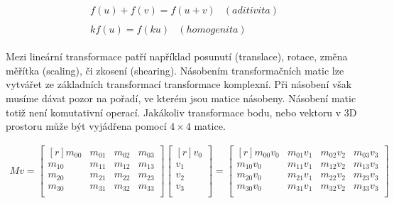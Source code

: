 \begin{align}
\begin{split}
f(u) + f(v) = f(u+v) 
\end{split}
\begin{split}
 (aditivita)
\end{split} \\
\begin{split}
kf(u) = f(ku)
\end{split}
\begin{split}
 (homogenita)
 \end{split}
\end{align}


Mezi lineární transformace patří například posunutí (translace), rotace, změna měřítka (scaling), či zkosení (shearing). Násobením transformačních matic lze vytvářet ze základních transformací transformace komplexní. Při násobení však musíme dávat pozor na pořadí, ve kterém jsou matice násobeny. Násobení matic totiž není komutativní operací. Jakákoliv transformace bodu, nebo vektoru v 3D prostoru může být vyjádřena pomocí $4 \times 4$ matice.

\begin{align} 
Mv = \begin{bmatrix*}[r]
  m_{00} & m_{01} & m_{02} & m_{03} \\
  m_{10} & m_{11} & m_{12} & m_{13} \\
  m_{20} & m_{21} & m_{22} & m_{23} \\
  m_{30} & m_{31} & m_{32} & m_{33} \\
\end{bmatrix*}
\begin{bmatrix*}[r]
 v_{0} \\
 v_{1} \\
 v_{2} \\
 v_{3} \\
\end{bmatrix*} =
\begin{bmatrix*}[r]
  m_{00}v_{0} & m_{01}v_{1} & m_{02}v_{2} & m_{03}v_{3} \\
  m_{10}v_{0} & m_{11}v_{1} & m_{12}v_{2} & m_{13}v_{3} \\
  m_{20}v_{0} & m_{21}v_{1} & m_{22}v_{2} & m_{23}v_{3} \\
  m_{30}v_{0} & m_{31}v_{1} & m_{32}v_{2} & m_{33}v_{3} \\
\end{bmatrix*}
\end{align}

